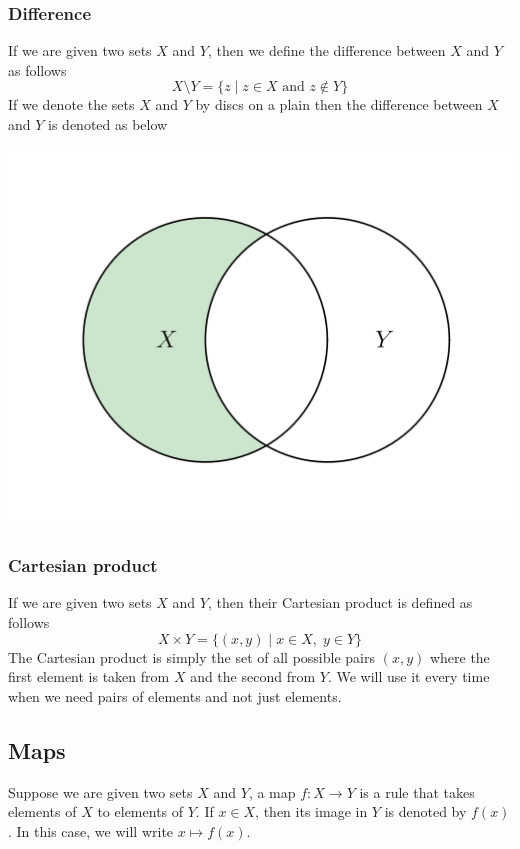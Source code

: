 \subsubsection{Difference}

If we are given two sets $X$ and $Y$, then we define the difference between $X$ and $Y$ as follows
\[
X\setminus Y = \{z\mid z\in X\text{ and }z\notin Y\}
\]
If we denote the sets $X$ and $Y$ by discs on a plain then the difference between $X$ and $Y$ is denoted as below
\begin{center}
\includegraphics[scale = 0.3]{Figures/graph_difference.png}
\end{center}

\subsubsection{Cartesian product}

If we are given two sets $X$ and $Y$, then their Cartesian product is defined as follows
\[
X \times Y = \{(x, y)\mid x\in X,\;y\in Y\}
\]
The Cartesian product is simply the set of all possible pairs $(x, y)$ where the first element is taken from $X$ and the second from $Y$.
We will use it every time when we need pairs of elements and not just elements.

\subsection{Maps}

\begin{definition}
Suppose we are given two sets $X$ and $Y$, a map $f\colon X\to Y$ is a rule that takes elements of $X$ to elements of $Y$.
If $x\in X$, then its image in $Y$ is denoted by $f(x)$.
In this case, we will write $x\mapsto f(x)$.
\end{definition}

